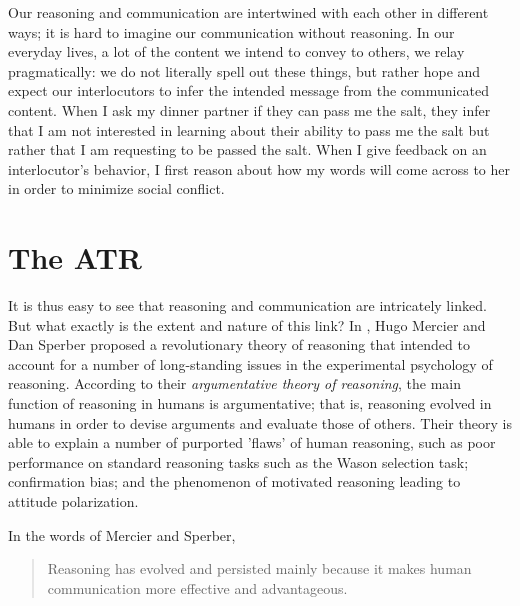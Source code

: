 Our reasoning and communication are intertwined with each other in different ways; it is hard to imagine our communication without reasoning. In our everyday lives, a lot of the content we intend to convey to others, we relay pragmatically:
we do not literally spell out these things, but rather hope and expect our interlocutors to infer the intended message from the communicated content.
When I ask my dinner partner if they can pass me the salt, they infer that I am not interested in learning about their ability to pass me the salt but rather that I am requesting to be passed the salt.
When I give feedback on an interlocutor's behavior, I first reason about how my words will come across to her in order to minimize social conflict.

\section{The ATR}

It is thus easy to see that reasoning and communication are intricately linked. But what exactly is the extent and nature of this link?
In \citeyear{MS11}, Hugo Mercier and Dan Sperber proposed a revolutionary
theory of reasoning that intended to account for a number of long-standing issues in the experimental psychology of reasoning.
According to their \emph{argumentative theory of reasoning}, the main function of reasoning in humans is argumentative; that is, reasoning evolved in humans in order to devise arguments and evaluate those of others. Their theory is able to explain a number of purported 'flaws' of human reasoning, such as poor performance on standard reasoning tasks such as the Wason selection task; confirmation bias; and the phenomenon of motivated reasoning leading to attitude polarization.

In the words of Mercier and Sperber,
\begin{quote}
    Reasoning has evolved and persisted mainly because it makes human communication more effective and advantageous.
    \citep[p.~60]{MS11}
\end{quote}

